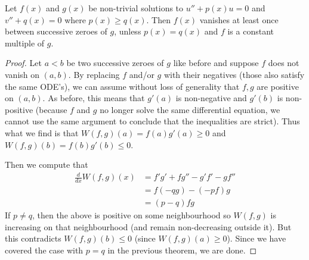 \begin{theorem}
Let $f(x)$ and $g(x)$ be non-trivial solutions to $u'' + p(x) u = 0$ and $v'' + q(x) = 0$ where $p(x) \geq q(x)$. Then $f(x)$ vanishes at least once between successive zeroes of $g$, unless $p(x) = q(x)$ and $f$ is a constant multiple of $g$.
\end{theorem}
\begin{proof}
Let $a < b$ be two successive zeroes of $g$ like before and suppose $f$ does not vanish on $(a, b)$. By replacing $f$ and/or $g$ with their negatives (those also satisfy the same ODE's), we can assume without loss of generality that $f, g$ are positive on $(a, b)$. As before, this means that $g'(a)$ is non-negative and $g'(b)$ is non-positive (because $f$ and $g$ no longer solve the same differential equation, we cannot use the same argument to conclude that the inequalities are strict). Thus what we find is that $W(f, g)(a) = f(a) g'(a) \geq 0$ and $W(f, g)(b) = f(b) g'(b) \leq 0$.

Then we compute that 
\begin{align*}
    \frac{d}{dx} W(f, g)(x) &= f' g' + f g'' - g' f' - g f''\\
    &= f(-qg) - (-pf)g\\
    &= (p - q) fg
\end{align*}
If $p \neq q$, then the above is positive on some neighbourhood so $W(f, g)$ is increasing on that neighbourhood (and remain non-decreasing outside it). But this contradicts $W(f, g)(b) \leq 0$ (since $W(f, g)(a) \geq 0$). Since we have covered the case with $p = q$ in the previous theorem, we are done. 
\end{proof}


